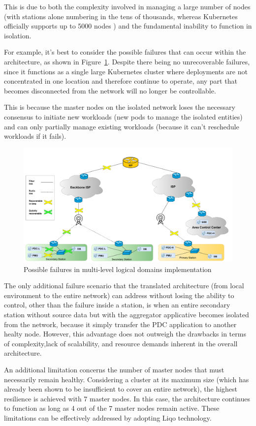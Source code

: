 This is due to both the complexity involved in managing a large number of nodes (with stations alone numbering in the tens of thousands, whereas Kubernetes officially supports up to 5000 nodes \cite{a3-1}) and the fundamental inability to function in isolation. 

For example, it's best to consider the possible failures that can occur within the architecture, as shown in Figure~\ref{fig:a-failures}. Despite there being no unrecoverable failures, since it functions as a single large Kubernetes cluster where deployments are not concentrated in one location and therefore continue to operate, any part that becomes disconnected from the network will no longer be controllable. 

This is because the master nodes on the isolated network loses the necessary consensus to initiate new workloads (new pods to manage the isolated entities) and can only partially manage existing workloads (because it can't reschedule workloads if it fails).

\begin{figure}[ht]\centering
\includegraphics[scale=0.20]{Pictures/actual-failures}
\caption{Possible failures in multi-level logical domains implementation}\label{fig:a-failures}
\end{figure}

The only additional failure scenario that the translated architecture (from local environment to the entire network) can address without losing the ability to control, other than the failure inside a station, is when an entire secondary station without source data but with the aggregator applicative becomes isolated from the network, because it simply transfer the PDC application to another healty node. However, this advantage does not outweigh the drawbacks in terms of complexity,lack of scalability, and resource demands inherent in the overall architecture. 

An additional limitation concerns the number of master nodes that must necessarily remain healthy. Considering a cluster at its maximum size (which has already been shown to be insufficient to cover an entire network), the highest resilience is achieved with 7 master nodes. In this case, the architecture continues to function as long as 4 out of the 7 master nodes remain active. These limitations can be effectively addressed by adopting Liqo technology.